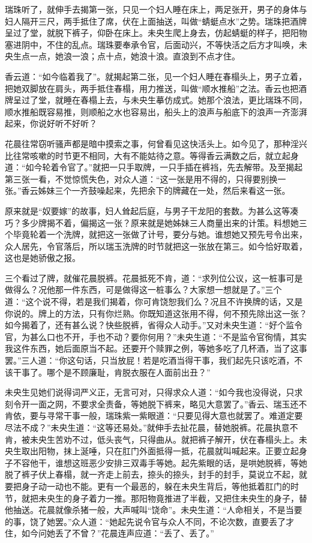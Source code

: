 \documentclass[a4paper,12pt,UTF8,twoside]{ctexbook}
\begin{document}
瑞珠听了，就伸手去揭第一张，只见一个妇人睡在床上，两足张开，男子的身体与妇人隔开三尺，两手抵住了席，伏在上面抽送，叫做“蜻蜓点水”之势。瑞珠把酒牌呈过了堂，就脱下裤子，仰卧在床上。未央生爬上身去，仿起蜻蜓的样子，把阳物塞进阴中，不住的乱点。瑞珠要奉承令官，后面动兴，不等快活之后方才叫唤，未央生点一点，她浪一浪；点十点，她浪十浪。直浪到不点才住。

香云道：“如今临着我了”。就揭起第二张，见一个妇人睡在春榻头上，男子立着，把她双脚放在肩头，两手抵住春榻，用力推送，叫做“顺水推船”之法。香云也把酒牌呈过了堂，就睡在春榻上去，与未央生摹仿成式。她那个浪法，更比瑞珠不同，顺水推船既容易推，则顺船之水也容易出，船头上的浪声与船底下的浪声一齐澎湃起来，你说好听不好听？

花晨往常窃听骚声都是暗中摸索之事，何曾看见这快活头上。如今见了，那种淫兴比往常咳嗽的时节更不相同，大有不能姑待之意。等得香云满数之后，就立起身道：“如今轮着令官了。”就把一只手取牌，一只手插在裤裆，先去解带。及至揭起第三张一看，不觉惊慌失色，对众人道：“这一张是用不得的，只得要别换一张。”香云姊妹三个一齐鼓噪起来，先把余下的牌藏在一处，然后来看这一张。

原来就是“奴要嫁”的故事，妇人耸起后庭，与男子干龙阳的套数。为甚么这等凑巧？多少牌揭不着，偏揭这一张？原来就是她姊妹三人商量出来的计策。料想她三个毕竟轮着一个洗牌，就把这一张做了计号，要分与她。谁想她又预先号令出来，众人居先，令官落后，所以瑞玉洗牌的时节就把这一张放在第三。如今恰好取着，这也是她骄傲之报。

三个看过了牌，就催花晨脱裤。花晨抵死不肯，道：“求列位公议，这一桩事可是做得么？况他那一件东西，可是做得这一桩事么？大家想一想就是了。”三个道：“这个说不得，若是我们揭着，你可肯饶恕我们么？况且不许换牌的话，又是你说的。牌上的方法，只有你烂熟。你既知道这张用不得，何不预先除出这一张？如今揭着了，还有甚么说？快些脱裤，省得众人动手。”又对未央生道：“好个监令官，为甚么口也不开，手也不动？要你何用？”未央生道：“不是监令官徇情，其实我这件东西，她后面原当不起。还要开个赎罪之例，等她多吃了几杯酒，当了这事罢。”三人道：“你这句话，只当放屁！若是吃酒当得干事，我们起先只该吃酒，不该干事了。哪个是不顾廉耻，肯脱衣服在人面前出丑？”

未央生见她们说得词严义正，无言可对，只得求众人道：“如今我也没得说，只求刻令开一面之网，不要求全责备，等她脱下裤来，略见大意罢了。”香云、瑞玉还不肯依，要与寻常干事一般，瑞珠紫一紫眼道：“只要见得大意也就罢了。难道定要尽法不成？”未央生道：“这等还易处。”就伸手去扯花晨，替她脱裤。花晨执意不肯，被未央生苦劝不过，低头丧气，只得曲从。就把裤子解开，伏在春榻头上。未央生取出阳物，抹上涎唾，只在肛门外面抵得一抵，花晨就叫喊起来。正要立起身子不容他干，谁想这班恶少安排三双毒手等她。起先紫眼的话，是哄她脱裤，等她脱了裤子伏上春榻，就一齐走上前去，捺头的捺头，封手的封手，莫说立不起，就要把身子动一动也不能。更有一个最恶的，躲在未央生背后，等他抵着肛门的时节，就把未央生的身子着力一推。那阳物竟推进了半截，又把住未央生的身子，替他抽送。花晨就像杀猪一般，大声喊叫“饶命”。未央生道：“人命相关，不是当要的事，饶了她罢。”众人道：“她起先说令官与众人不同，不论次数，直要丢了才住，如今问她丢了不曾？”花晨连声应道：“丢了、丢了。”
\end{document}
